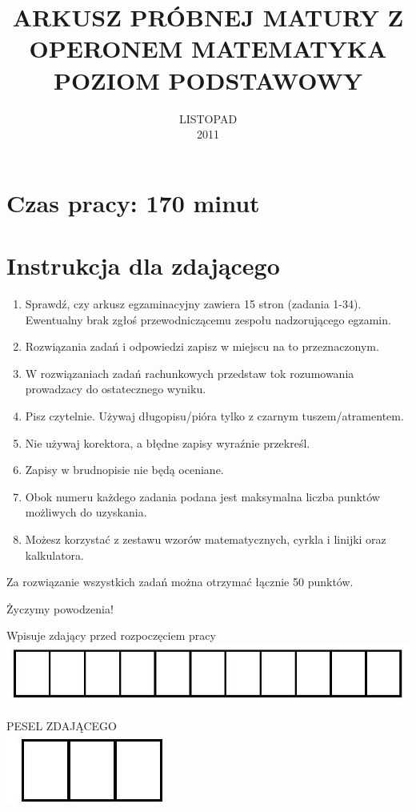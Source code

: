 \documentclass[10pt]{article}
\title{ARKUSZ PRÓBNEJ MATURY Z OPERONEM MATEMATYKA \\
 POZIOM PODSTAWOWY }
\author{LISTOPAD\\
2011}
\date{}
\begin{document}
\maketitle


\section*{Czas pracy: 170 minut}
\section*{Instrukcja dla zdającego}
\begin{enumerate}
  \item Sprawdź, czy arkusz egzaminacyjny zawiera 15 stron (zadania 1-34). Ewentualny brak zgłoś przewodniczącemu zespołu nadzorującego egzamin.
  \item Rozwiązania zadań i odpowiedzi zapisz w miejscu na to przeznaczonym.
  \item W rozwiązaniach zadań rachunkowych przedstaw tok rozumowania prowadzacy do ostatecznego wyniku.
  \item Pisz czytelnie. Używaj długopisu/pióra tylko z czarnym tuszem/atramentem.
  \item Nie używaj korektora, a błędne zapisy wyraźnie przekreśl.
  \item Zapisy w brudnopisie nie będą oceniane.
  \item Obok numeru każdego zadania podana jest maksymalna liczba punktów możliwych do uzyskania.
  \item Możesz korzystać z zestawu wzorów matematycznych, cyrkla i linijki oraz kalkulatora.
\end{enumerate}

Za rozwiązanie wszystkich zadań można otrzymać łącznie 50 punktów.

Życzymy powodzenia!

Wpisuje zdający przed rozpoczęciem pracy\\
\includegraphics[max width=\textwidth, center]{2024_11_21_3a102e13f4b06a61f46fg-01}

PESEL ZDAJĄCEGO\\
\includegraphics[max width=\textwidth, center]{2024_11_21_3a102e13f4b06a61f46fg-01(1)}
\end{document}
